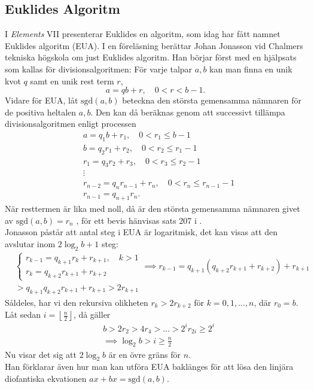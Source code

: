 \subsection*{Euklides Algoritm}
I \textit{Elements} VII presenterar Euklides en algoritm, som idag har fått namnet Euklides algoritm (EUA). I en föreläsning berättar Johan Jonasson vid Chalmers tekniska högskola om just Euklides algoritm. Han börjar först med en hjälpsats som kallas för divisionsalgoritmen:
För varje talpar $a,b$ kan man finna en unik kvot $q$ samt en unik rest term $r$, 
$$a=qb+r, \quad 0<r<b-1.$$
Vidare för EUA, låt $\text{sgd}{(a,b)}$ beteckna den största gemensamma nämnaren för de positiva heltalen $a,b$. 
Den kan då beräknas genom att successivt tillämpa divisionsalgoritmen enligt processen
\begin{align*}
	&a=q_1b+r_1,\quad 0<r_1\leq b-1\\
	&b=q_2r_1+r_2,\quad 0<r_2\leq r_1-1\\
	&r_1=q_3r_2+r_3,\quad 0<r_3\leq r_2-1\\
	&\vdots\\
	&r_{n-2}=q_nr_{n-1}+r_n,\quad 0<r_n\leq r_{n-1}-1\\
	&r_{n-1}=q_{n+1}r_n.
\end{align*}
När resttermen är lika med noll, då är den största gemensamma nämnaren givet av $\text{sgd}{(a,b)}=r_n$ \cite{talteori1}, för ett bevis hänvisas sats 207 i \cite{hardy}.\\
\iftrue
\noindent
Jonasson påstår att antal steg i EUA är logaritmisk, det kan visas att den avslutar inom $2\log_2{b}+1$ steg:
\begin{align*}
&\begin{cases}
	r_{k-1}=q_{k+1}r_{k}+r_{k+1},\quad k>1\\
	r_k=q_{k+2}r_{k+1}+r_{k+2}
\end{cases}
\implies r_{k-1}=q_{k+1}(q_{k+2}r_{k+1}+r_{k+2})+r_{k+1}\\
&>q_{k+1}q_{k+2}r_{k+1}+r_{k+1}>2r_{k+1}
\end{align*}
Såldeles, har vi den rekursiva olikheten $r_k>2r_{k+2}$ för $k=0,1,\ldots,n$, där $r_0=b$. Låt sedan $i=\left\lfloor\frac{n}{2}\right\rfloor$, då gäller
\begin{align*}
	&b>2r_2>4r_4>\ldots>2^ir_{2i}\geq2^i\\
	&\implies \log_2{b}>i\geq \frac{n}{2}
\end{align*}
Nu visar det sig att $2\log_2b$ är en övre gräns för $n$.\\
\fi
Han förklarar även hur man kan utföra EUA baklänges för att lösa den linjära diofantiska ekvationen $ax+bx=\text{sgd}{(a,b)}$.

